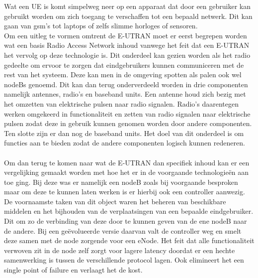 Wat een UE is komt simpelweg neer op een apparaat dat door een gebruiker kan gebruikt worden om zich toegang te verschaffen tot een bepaald netwerk. Dit kan gaan van gsm's tot laptops of zelfs slimme horloges of sensoren. \\

Om een uitleg te vormen omtrent de E-UTRAN moet er eerst begrepen worden wat een basis Radio Access Network inhoud vanwege het feit dat een E-UTRAN het vervolg op deze technologie is. Dit onderdeel kan gezien worden als het radio gedeelte om ervoor te zorgen dat eindgebruikers kunnen communiceren met de rest van het systeem. Deze kan men in de omgeving spotten als palen ook wel nodeBs genoemd. Dit kan dan terug onderverdeeld worden in drie componenten namelijk antennes, radio's en baseband units. Een antenne houd zich bezig met het  omzetten van elektrische pulsen naar radio signalen. Radio's daarentegen werken omgekeerd in functionaliteit en zetten van radio signalen naar elektrische pulsen zodat deze in gebruik kunnen genomen worden door andere componenten. Ten slotte zijn er dan nog de baseband units. Het doel van dit onderdeel is om functies aan te bieden zodat de andere componenten logisch kunnen redeneren. \autocite{Jones2021} \\ \\
Om dan terug te komen naar wat de E-UTRAN dan specifiek inhoud kan er een vergelijking gemaakt worden met hoe het er in de voorgaande technologieën aan toe ging. Bij deze was er namelijk een nodeB zoals bij voorgaande besproken maar om deze te kunnen laten werken is er hierbij ook een controller aanwezig. De voornaamste taken van dit object waren het beheren van beschikbare middelen en het bijhouden van de verplaatsingen van een bepaalde eindgebruiker. Dit om zo de verbinding van deze door te kunnen geven van de ene nodeB naar de andere. Bij een  geëvolueerde versie daarvan valt de controller weg en smelt deze samen met de node zorgende voor een eNode. \autocite{Ghayas2019} Het feit dat alle functionaliteit verwoven zit in de node zelf zorgt voor lagere latency doordat er een hechte samenwerking is tussen de verschillende protocol lagen. Ook elimineert het een single point of failure en verlaagt het de kost. \autocite{Palat2011} \\

